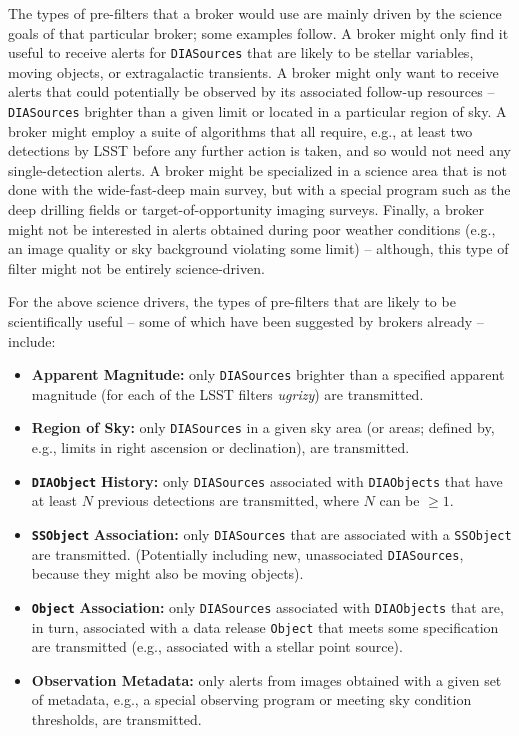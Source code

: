 \documentclass[DM,lsstdraft,authoryear,toc]{lsstdoc}
\begin{document}
The types of pre-filters that a broker would use are mainly driven by the science goals of that particular broker; some examples follow.
A broker might only find it useful to receive alerts for {\tt DIASources} that are likely to be stellar variables, moving objects, or extragalactic transients.
A broker might only want to receive alerts that could potentially be observed by its associated follow-up resources -- {\tt DIASources} brighter than a given limit or located in a particular region of sky. 
A broker might employ a suite of algorithms that all require, e.g., at least two detections by LSST before any further action is taken, and so would not need any single-detection alerts.
A broker might be specialized in a science area that is not done with the wide-fast-deep main survey, but with a special program such as the deep drilling fields or target-of-opportunity imaging surveys. 
Finally, a broker might not be interested in alerts obtained during poor weather conditions (e.g., an image quality or sky background violating some limit) -- although, this type of filter might not be entirely science-driven.

For the above science drivers, the types of pre-filters that are likely to be scientifically useful -- some of which have been suggested by brokers already -- include:
\begin{itemize}
\item {\bf Apparent Magnitude:} only {\tt DIASources} brighter than a specified apparent magnitude (for each of the LSST filters {\it ugrizy}) are transmitted. 
\item {\bf Region of Sky:} only {\tt DIASources} in a given sky area (or areas; defined by, e.g., limits in right ascension or declination), are transmitted. 
\item \texttt{\bf DIAObject} {\bf History:} only {\tt DIASources} associated with {\tt DIAObjects} that have at least $N$ previous detections are transmitted, where $N$ can be $\geq1$. 
\item \texttt{\bf SSObject} {\bf Association:} only {\tt DIASources} that are associated with a {\tt SSObject} are transmitted. (Potentially including new, unassociated {\tt DIASources}, because they might also be moving objects).
\item \texttt{\bf Object} {\bf Association:} only {\tt DIASources} associated with {\tt DIAObjects} that are, in turn, associated with a data release {\tt Object} that meets some specification are transmitted (e.g., associated with a stellar point source).
\item {\bf Observation Metadata:} only alerts from images obtained with a given set of metadata, e.g., a special observing program or meeting sky condition thresholds, are transmitted.
\end{itemize}
\end{document}
